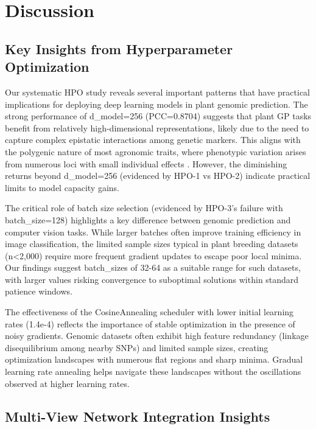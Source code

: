 \documentclass[11pt,a4paper]{article}
\begin{document}
\section{Discussion}
\label{sec:discussion}

\subsection{Key Insights from Hyperparameter Optimization}
\label{subsec:hpo_insights}

Our systematic HPO study reveals several important patterns that have practical implications for deploying deep learning models in plant genomic prediction. The strong performance of d\_model=256 (PCC=0.8704) suggests that plant GP tasks benefit from relatively high-dimensional representations, likely due to the need to capture complex epistatic interactions among genetic markers. This aligns with the polygenic nature of most agronomic traits, where phenotypic variation arises from numerous loci with small individual effects \citep{boyle2017expanded}. However, the diminishing returns beyond d\_model=256 (evidenced by HPO-1 vs HPO-2) indicate practical limits to model capacity gains.

The critical role of batch size selection (evidenced by HPO-3's failure with batch\_size=128) highlights a key difference between genomic prediction and computer vision tasks. While larger batches often improve training efficiency in image classification, the limited sample sizes typical in plant breeding datasets (n<2,000) require more frequent gradient updates to escape poor local minima. Our findings suggest batch\_sizes of 32-64 as a suitable range for such datasets, with larger values risking convergence to suboptimal solutions within standard patience windows.

The effectiveness of the CosineAnnealing scheduler with lower initial learning rates (1.4e-4) reflects the importance of stable optimization in the presence of noisy gradients. Genomic datasets often exhibit high feature redundancy (linkage disequilibrium among nearby SNPs) and limited sample sizes, creating optimization landscapes with numerous flat regions and sharp minima. Gradual learning rate annealing helps navigate these landscapes without the oscillations observed at higher learning rates.

\subsection{Multi-View Network Integration Insights}
\label{subsec:multiview_insights}
\end{document}
